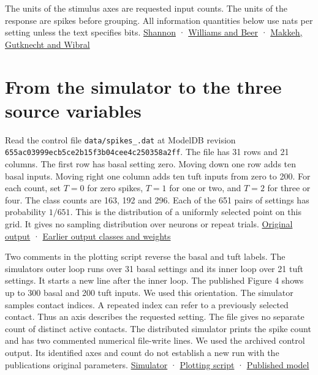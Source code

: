 The units of the stimulus axes are requested input counts. The units of the response are spikes before grouping. All information quantities below use nats per setting unless the text specifies bits. \href{https://doi.org/10.1002/j.1538-7305.1948.tb01338.x}{Shannon} · \href{https://arxiv.org/abs/1004.2515v1}{Williams and Beer} · \href{https://arxiv.org/abs/2002.03356v5}{Makkeh, Gutknecht and Wibral}

\clearpage

\section{From the simulator to the three source variables}\label{from-the-simulator-to-the-three-source-variables}

Read the control file \nolinkurl{data/spikes_.dat} at ModelDB revision \nolinkurl{655ac03999ecb5ce2b15f3b04cee4c250358a2ff}. The file has 31 rows and 21 columns. The first row has basal setting zero. Moving down one row adds ten basal inputs. Moving right one column adds ten tuft inputs from zero to 200. For each count, set \(T=0\) for zero spikes, \(T=1\) for one or two, and \(T=2\) for three or four. The class counts are 163, 192 and 296. Each of the 651 pairs of settings has probability \(1/651\). This is the distribution of a uniformly selected point on this grid. It gives no sampling distribution over neurons or repeat trials. \href{https://github.com/ModelDBRepository/180373/blob/655ac03999ecb5ce2b15f3b04cee4c250358a2ff/data/spikes_.dat}{Original output} · \href{https://doi.org/10.3390/e24081021}{Earlier output classes and weights}

Two comments in the plotting script reverse the basal and tuft labels. The simulator\textquotesingle s outer loop runs over 31 basal settings and its inner loop over 21 tuft settings. It starts a new line after the inner loop. The published Figure 4 shows up to 300 basal and 200 tuft inputs. We used this orientation. The simulator samples contact indices. A repeated index can refer to a previously selected contact. Thus an axis describes the requested setting. The file gives no separate count of distinct active contacts. The distributed simulator prints the spike count and has two commented numerical file-write lines. We used the archived control output. Its identified axes and count do not establish a new run with the publication\textquotesingle s original parameters. \href{https://github.com/ModelDBRepository/180373/blob/655ac03999ecb5ce2b15f3b04cee4c250358a2ff/simulationcode/Run.hoc}{Simulator} · \href{https://github.com/ModelDBRepository/180373/blob/655ac03999ecb5ce2b15f3b04cee4c250358a2ff/data/PhenomModels.m}{Plotting script} · \href{https://doi.org/10.1371/journal.pcbi.1004090}{Published model}

